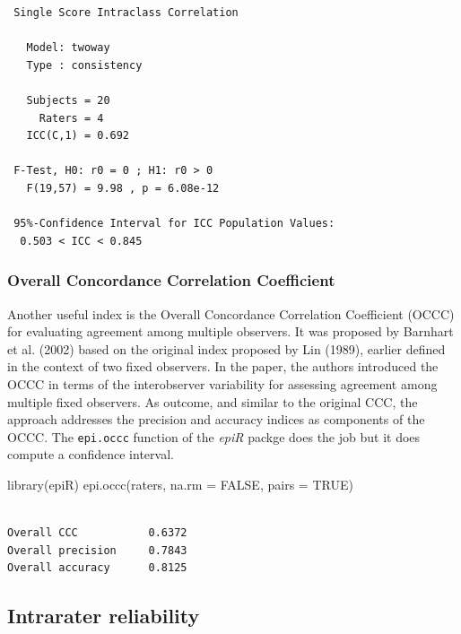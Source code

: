 \documentclass[
  letterpaper,
]{book}
\newenvironment{Shaded}{\begin{snugshade}}{\end{snugshade}}
\newcommand{\AttributeTok}[1]{\textcolor[rgb]{0.40,0.45,0.13}{#1}}
\newcommand{\ConstantTok}[1]{\textcolor[rgb]{0.56,0.35,0.01}{#1}}
\newcommand{\FunctionTok}[1]{\textcolor[rgb]{0.28,0.35,0.67}{#1}}
\newcommand{\NormalTok}[1]{\textcolor[rgb]{0.00,0.23,0.31}{#1}}
\begin{document}
\begin{verbatim}
 Single Score Intraclass Correlation

   Model: twoway 
   Type : consistency 

   Subjects = 20 
     Raters = 4 
   ICC(C,1) = 0.692

 F-Test, H0: r0 = 0 ; H1: r0 > 0 
   F(19,57) = 9.98 , p = 6.08e-12 

 95%-Confidence Interval for ICC Population Values:
  0.503 < ICC < 0.845
\end{verbatim}

\hypertarget{overall-concordance-correlation-coefficient}{%
\subsubsection{Overall Concordance Correlation
Coefficient}\label{overall-concordance-correlation-coefficient}}

Another useful index is the Overall Concordance Correlation Coefficient
(OCCC) for evaluating agreement among multiple observers. It was
proposed by Barnhart et al. (2002) based on the original index proposed
by Lin (1989), earlier defined in the context of two fixed observers. In
the paper, the authors introduced the OCCC in terms of the interobserver
variability for assessing agreement among multiple fixed observers. As
outcome, and similar to the original CCC, the approach addresses the
precision and accuracy indices as components of the OCCC. The
\texttt{epi.occc} function of the \emph{epiR} packge does the job but it
does compute a confidence interval.

\begin{Shaded}
\begin{Highlighting}[]
\FunctionTok{library}\NormalTok{(epiR)}
\FunctionTok{epi.occc}\NormalTok{(raters, }\AttributeTok{na.rm =} \ConstantTok{FALSE}\NormalTok{, }\AttributeTok{pairs =} \ConstantTok{TRUE}\NormalTok{)}
\end{Highlighting}
\end{Shaded}

\begin{verbatim}

Overall CCC           0.6372
Overall precision     0.7843
Overall accuracy      0.8125
\end{verbatim}

\hypertarget{intrarater-reliability}{%
\subsection{Intrarater reliability}\label{intrarater-reliability}}
\end{document}
